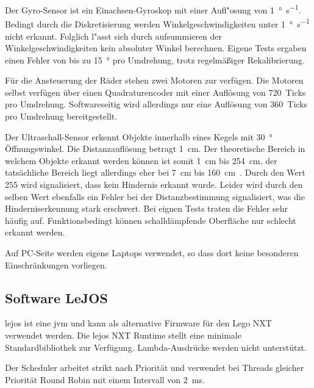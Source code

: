 \documentclass[oneside,abstractoff,a4paper]{scrartcl}
\begin{document}
Der Gyro-Sensor ist ein Einachsen-Gyroskop mit einer Aufl"osung von \SI{1}{\degree\per\second}. Bedingt durch die Diskretisierung werden Winkelgeschwindigkeiten unter \SI{1}{\degree\per\second} nicht erkannt. Folglich l"asst sich durch aufsummieren der Winkelgeschwindigkeiten kein absoluter Winkel berechnen. Eigene Tests ergaben einen Fehler von bis zu \SI{15}{\degree} pro Umdrehung, trotz regelmäßiger Rekalibrierung.

Für die Ansteuerung der Räder stehen zwei Motoren zur verfügen. Die Motoren selbst verfügen über einen Quadraturencoder mit einer Auflösung von \SI{720}{Ticks} pro Umdrehung. Softwareseitig wird allerdings nur eine Auflösung von \SI{360}{Ticks} pro Umdrehung bereitgestellt.

Der Ultraschall-Sensor erkennt Objekte innerhalb eines Kegels mit \SI{30}{\degree} Öffnungswinkel. Die Distanzauflösung betragt \SI{1}{\centi\meter}. Der theoretische Bereich in welchem Objekte erkannt werden können ist somit \SI{1}{\centi\meter} bis \SI{254}{\centi\meter}, der tatsächliche Bereich liegt allerdings eher bei \SI{7}{\centi\meter} bis \SI{160}{\centi\meter}~\cite{NXTtime_ussensor}. Durch den Wert 255 wird signalisiert, dass kein Hindernis erkannt wurde. Leider wird durch den selben Wert ebenfalls ein Fehler bei der Distanzbestimmung signalisiert, was die Hinderniserkennung stark erschwert. Bei eignen Tests traten die Fehler sehr häufig auf. Funktionsbedingt können schalldämpfende Oberfläche nur schlecht erkannt werden.

Auf PC-Seite werden eigene Laptops verwendet, so dass dort keine besonderen Einschränkungen vorliegen.
\subsection{Software LeJOS}

\ac{lejos} ist eine \ac{jvm} und kann als alternative Firmware für den Lego NXT verwendet werden.
Die \ac{lejos} NXT Runtime stellt eine minimale Standardbibliothek zur Verfügung. Lambda-Ausdrücke werden nicht unterstützt.

Der Scheduler arbeitet strikt nach Priorität und verwendet bei Threads gleicher Priorität Round Robin mit einem Intervall von \SI{2}{\milli\second}.
\end{document}
